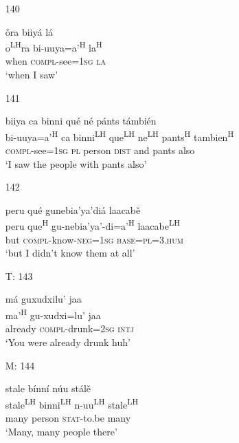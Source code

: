 \begin{itemize}
\item[140]
 
\glll   \v{o}ra biiy\'{a} l\'{a}\\
 o\textsuperscript{LH}ra bi-uuya=a'\textsuperscript{H}  la\textsuperscript{H} \\
 when \textsc{compl}-see=\textsc{1sg} \textsc{la}\\
\glt `when I saw'
 


\item[141]
 
\glll   biiya ca binni qu\'{e} n\'{e} p\'{a}nts t\'{a}mbi\'{e}n\\
 bi-uuya=a'\textsuperscript{H} ca binni\textsuperscript{LH} que\textsuperscript{LH} ne\textsuperscript{LH} pants\textsuperscript{H} tambien\textsuperscript{H}\\
 \textsc{compl}-see=\textsc{1sg} \textsc{pl} person \textsc{dist} and pants also\\
\glt `I saw the people with pants also'
 


\item[142]
 
\glll   peru qu\'{e} gunebia'ya'di\'{a} laacab\v{e}\\
 peru que\textsuperscript{H} gu-nebia'ya'-di=a'\textsuperscript{H} laacabe\textsuperscript{LH}\\
but \textsc{compl}-know-\textsc{neg}=\textsc{1sg} \textsc{base}=\textsc{pl}=\textsc{3.hum}\\
\glt `but I didn't know them at all'
 


\item[T: 143]
 
\glll  m\'{a} guxudxilu' jaa\\
ma'\textsuperscript{H} gu-xudxi=lu' jaa\\
already \textsc{compl}-drunk=\textsc{2sg} \textsc{intj}\\
\glt `You were already drunk huh'
 


\item[M: 144]
 
\glll   stale b\'{i}nn\'{i} n\'{u}u st\'{a}l\v{e}\\
stale\textsuperscript{LH} binni\textsuperscript{LH} n-uu\textsuperscript{LH} stale\textsuperscript{LH}\\
many person \textsc{stat}-to.be many\\
\glt `Many, many people there'
 



\end{itemize}
